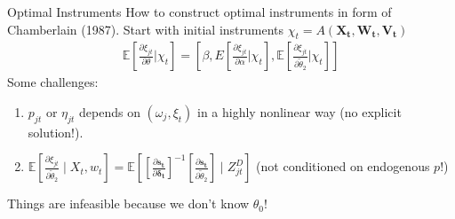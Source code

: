 

\begin{frame}{Optimal Instruments}
How to construct optimal instruments in form of Chamberlain (1987). Start with initial instruments $\chi_t = A\left(\mathbf{X_t},\mathbf{W_t},\mathbf{V_t}\right)$
\begin{eqnarray*}
\mathbb{E}\left[\frac{\partial \xi_{jt}}{\partial \theta} | \chi_{t} \right] = \left[\beta, E\left[\frac{\partial \xi_{jt}}{\partial \alpha} | \chi_{t} \right] ,
 \mathbb{E}\left[\frac{\partial \xi_{jt}}{\partial \widetilde{\theta}_2} | \chi_{t} \right] \right]
\end{eqnarray*}
Some challenges:
\begin{enumerate}
\item $p_{jt}$ or $\eta_{jt}$ depends on $(\omega_{j},\xi_{t})$ in a highly nonlinear way (no explicit solution!).
\item $\mathbb{E}\left[\frac{\partial \xi_{jt}}{\partial \widetilde{\theta}_2} \mid X_t, w_{t} \right] =\mathbb{E}\left[\left[\frac{\partial \mathbf{s_t}}{\partial \mathbf{\delta_t}}\right]^{-1} 
\left[\frac{\partial \mathbf{s_t}}{\partial \widetilde{\theta}_2}\right] \mid Z_{jt}^D \right]$  (not conditioned on endogenous $p$!)
\end{enumerate}
Things are \alert{infeasible} because we don't know $\theta_0$!
\end{frame}


